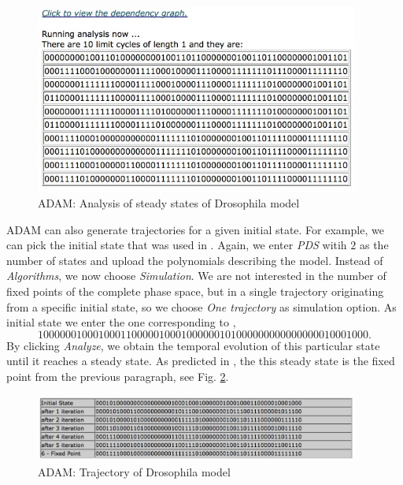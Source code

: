 \documentclass[11pt]{amsart}
\begin{document}
\begin{figure}[htb]
 \centering
 \includegraphics[width=0.95\textwidth]{DroAlgOutput.jpg}
 \caption{ADAM: Analysis of steady states of Drosophila model}
 \label{fig:alg}
\end{figure}
 
ADAM can also generate trajectories for a given initial state. For example, we
can pick the initial state that was used in \cite[Figure 4(a)]{AO}. Again, we
enter {\it PDS} witih $2$ as the number of states and upload the polynomials
describing the model. Instead of {\it Algorithms}, we now choose {\it
Simulation}. We are not interested in the number of fixed points of the
complete phase space, but in a single trajectory originating from a specific
initial state, so we choose {\it One trajectory} as simulation option. As
initial state we enter the one corresponding to \cite[Figure 4(a)]{AO},
$$100000010001000110000010001000000101000000000000000010001000.$$
By clicking {\it Analyze}, we obtain the temporal evolution of this particular
state until it reaches a steady state. As predicted in \cite{AO}, the this
steady state is the fixed point from the previous paragraph, see Fig.
\ref{fig:traj}.

\begin{figure}[htb]
 \centering
 \includegraphics[width=0.95\textwidth]{DroTraj.jpg}
 \caption{ADAM: Trajectory of Drosophila model}
 \label{fig:traj}
\end{figure}
\end{document}

